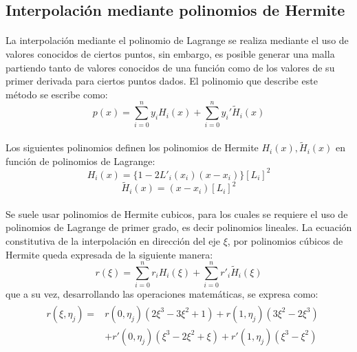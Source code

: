 \documentclass[letterpaper, openright, 12pt]{book}
\begin{document}
		\subsection{Interpolación mediante polinomios de Hermite}
			\paragraph*{}
				La interpolación mediante el polinomio de Lagrange se realiza mediante el uso de valores conocidos de ciertos puntos, sin embargo, es posible generar una malla partiendo tanto de valores conocidos de una función como de los valores de su primer derivada para ciertos puntos dados. El polinomio que describe este método se escribe como:
				\begin{equation}
					p(x) = \sum_{i = 0}^{n} y_{i}H_{i}(x) + \sum_{i = 0}^{n}y_{i}\prime \widetilde{H}_{i}(x)
				\end{equation}
			
			\paragraph*{}
				Los siguientes polinomios definen los polinomios de Hermite $H_{i}(x), \widetilde{H}_{i}(x)$ en función de polinomios de Lagrange:
				\begin{equation}
					H_{i}(x) = \{  1 - 2L\prime_{i}(x_{i})(x - x_{i})  \} \left[L_{i}\right]^2
				\end{equation}
				\begin{equation}
					\widetilde{H}_{i}(x) = (x - x_{i}) \left[L_{i}\right] ^ 2
				\end{equation}
			\paragraph*{}
				Se suele usar polinomios de Hermite cubicos, para los cuales se requiere el uso de polinomios de Lagrange de primer grado, es decir polinomios lineales. La ecuación constitutiva de la interpolación en dirección del eje $\xi$, por polinomios cúbicos de Hermite queda expresada de la siguiente manera:
				\begin{equation}
					r(\xi) = \sum_{i = 0}^{n} r_{i}H_{i}(\xi) + \sum_{i = 0}^{n} r\prime_{i}\widetilde{H}_{i}(\xi)
				\end{equation}
				que a su vez, desarrollando las operaciones matemáticas, se expresa como:
				\begin{align}
					&\begin{aligned}
						r(\xi, \eta_{j}) =& r(0, \eta_{j})(2\xi^3 - 3\xi^2 +1) + r(1, \eta_{j})(3\xi^2 - 2\xi^3) \\ &+ r\prime(0, \eta_{j})(\xi^3 - 2\xi^2 + \xi) + r\prime(1, \eta_{j})(\xi^3 - \xi^2)
					\end{aligned}
				\end{align}
				
\end{document}
